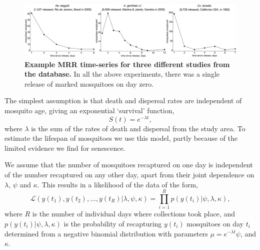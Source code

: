 \documentclass[12pt]{article}
\begin{document}
\begin{figure}[h]
	\centerline{\includegraphics[width=1.25\textwidth]{./Figure_files/mrr_exampleMRRSeries.pdf}}
	\caption{\textbf{Example MRR time-series for three different studies from the \cite{guerra2014global} database.} In all the above experiments, there was a single release of marked mosquitoes on day zero.}
	\label{fig:mrr_exampleMRRSeries}
\end{figure}

The simplest assumption is that death and dispersal rates are independent of mosquito age, giving an exponential `survival' function,
%
\begin{equation}
S(t) = e^{-\lambda t},
\end{equation}
%
where $\lambda$ is the sum of the rates of death and dispersal from the study area. To estimate the lifespan of mosquitoes we use this model, partly because of the limited evidence we find for senescence.

We assume that the number of mosquitoes recaptured on one day is independent of the number recaptured on any other day, apart from their joint dependence on $\lambda$, $\psi$ and $\kappa$. This results in a likelihood of the data of the form,
%
\begin{equation}
\mathcal{L}(y(t_1),y(t_2),...,y(t_R)|\lambda,\psi,\kappa) = \prod\limits_{i=1}^{R} p(y(t_i)|\psi,\lambda,\kappa),
\end{equation}
%
where $R$ is the number of individual days where collections took place, and $p(y(t_i)|\psi,\lambda,\kappa)$ is the probability of recapturing $y(t_i)$ mosquitoes on day $t_i$ determined from a negative binomial distribution with parameters $\mu = e^{-\lambda t} \psi$, and $\kappa$.
\end{document}
